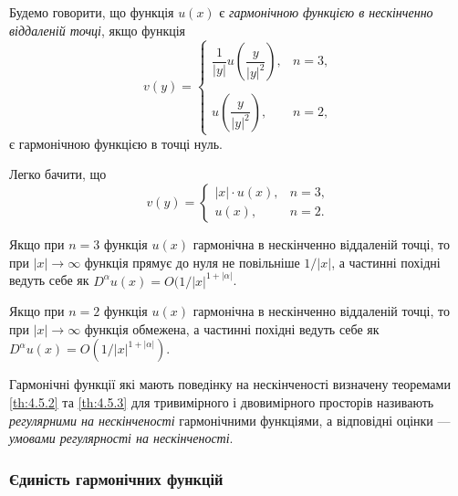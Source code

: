 \begin{definition}
	Будемо говорити, що функція $u(x)$ є \textit{гармонічною функцією в нескінченно віддаленій точці}, якщо функція 
	\begin{equation}
		v(y) = \begin{cases}
			\dfrac{1}{|y|} u \left( \dfrac{y}{|y|^2} \right), & n = 3, \\ & \\
			u \left( \dfrac{y}{|y|^2} \right), & n = 2,
		\end{cases}
	\end{equation}
	є гармонічною функцією в точці нуль.
\end{definition}

Легко бачити, що
\begin{equation}
	v(y) = \begin{cases}
		|x| \cdot u(x), & n = 3, \\
		u(x), & n = 2.
	\end{cases}
\end{equation}

\begin{theorem}
	\label{th:4.5.2}
	Якщо при $n = 3$ функція $u(x)$ гармонічна в нескінченно віддаленій точці, то при $|x| \to \infty$ функція прямує до нуля не повільніше $1/|x|$, а частинні похідні ведуть себе як $D^\alpha u(x) = O (1 / |x|^{1 + |\alpha|}$.
\end{theorem}

\begin{theorem}
	\label{th:4.5.3}
	Якщо при $n = 2$ функція $u(x)$ гармонічна в нескінченно віддаленій точці, то при $|x| \to \infty$ функція  обмежена, а частинні похідні ведуть себе як $D^\alpha u(x) = O (1 / |x|^{1 + |\alpha|} )$.
\end{theorem}

\begin{definition}
	Гармонічні функції які мають поведінку на нескінченості визначену теоремами \ref{th:4.5.2} та \ref{th:4.5.3} для тривимірного і двовимірного просторів називають \textit{регулярними на нескінченості} гармонічними функціями, а відповідні оцінки --- \textit{умовами регулярності на нескінченості}.
\end{definition}

\subsubsection{Єдиність гармонічних функцій}

